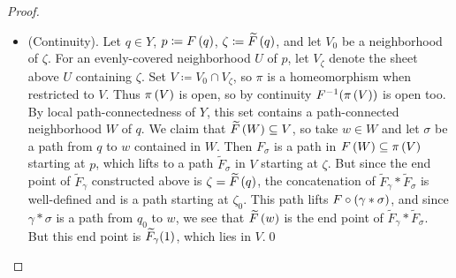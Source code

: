 \documentclass[../Moduli_Spaces_of_Riemann_Surfaces.tex]{subfiles}
\begin{document}
\begin{proof}
\begin{itemize}
\begin{center}
                \end{center}
                \vspace{-0.2in}
            \item (Continuity). Let $q\in Y$, $p\coloneqq F\left(q\right)$, $\zeta\coloneqq\widetilde{F}\left(q\right)$, and let $V_0$ be a neighborhood of $\zeta$. For an evenly-covered neighborhood $U$ of $p$, let $V_\zeta$ denote the sheet above $U$ containing $\zeta$. Set $V\coloneqq V_0\cap V_\zeta$, so $\pi$ is a homeomorphism when restricted to $V$. Thus $\pi\left(V\right)$ is open, so by continuity $F^{-1}\!\left(\pi\left(V\right)\right)$ is open too. By local path-connectedness of $Y$, this set contains a path-connected neighborhood $W$ of $q$. We claim that $\widetilde{F}\left(W\right)\subseteq V$, so take $w\in W$ and let $\sigma$ be a path from $q$ to $w$ contained in $W$. Then $F_\sigma$ is a path in $F\left(W\right)\subseteq\pi\left(V\right)$ starting at $p$, which lifts to a path $\widetilde{F}_\sigma$ in $V$ starting at $\zeta$. But since the end point of $\widetilde{F}_\gamma$ constructed above is $\zeta=\widetilde{F}\left(q\right)$, the concatenation of $\widetilde{F}_\gamma\ast\widetilde{F}_\sigma$ is well-defined and is a path starting at $\zeta_0$. This path lifts $F\circ\left(\gamma\ast\sigma\right)$, and since $\gamma\ast\sigma$ is a path from $q_0$ to $w$, we see that $\widetilde{F}\left(w\right)$ is the end point of $\widetilde{F}_\gamma\ast\widetilde{F}_\sigma$. But this end point is $\widetilde{F}_\gamma\!\left(1\right)$, which lies in $V$.\qed
        \end{itemize}
    \end{proof}
\end{document}
